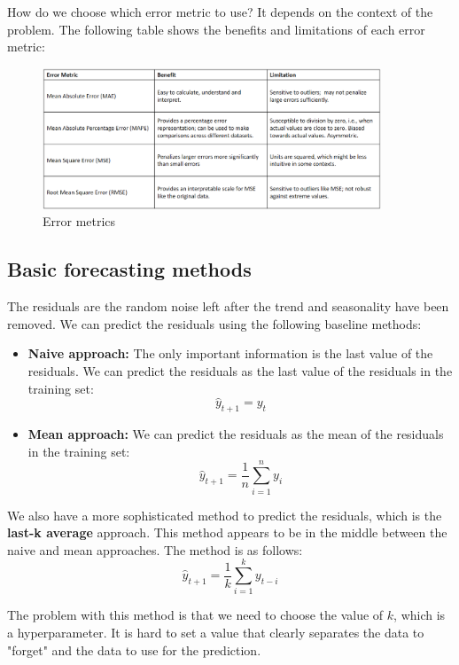 How do we choose which error metric to use? It depends on the context of the problem.
The following table shows the benefits and limitations of each error metric:

\begin{figure}[H]
    \centering
    \includegraphics[width=0.9\textwidth]{figures/error_metrics.png}
    \caption{Error metrics}
    \label{fig:error_metrics}
\end{figure}

\subsection{Basic forecasting methods}

The residuals are the random noise left after the trend and seasonality have been
removed. We can predict the residuals using the following baseline methods:

\begin{itemize}
    \item \textbf{Naive approach:} The only important information is the last value
    of the residuals. We can predict the residuals as the last value of the residuals
    in the training set:
    $$\hat{y}_{t+1} = y_t$$

    \item \textbf{Mean approach:} We can predict the residuals as the mean of the residuals
    in the training set:
    $$\hat{y}_{t+1} = \frac{1}{n} \sum_{i=1}^n y_i$$
\end{itemize}

We also have a more sophisticated method to predict the residuals, which is the
\textbf{last-k average} approach. This method appears to be in the middle between
the naive and mean approaches. The method is as follows:
$$\hat{y}_{t+1} = \frac{1}{k} \sum_{i=1}^k y_{t-i}$$

The problem with this method is that we need to choose the value of $k$, which is
a hyperparameter. It is hard to set a value that clearly separates the data to
"forget" and the data to use for the prediction.\\

